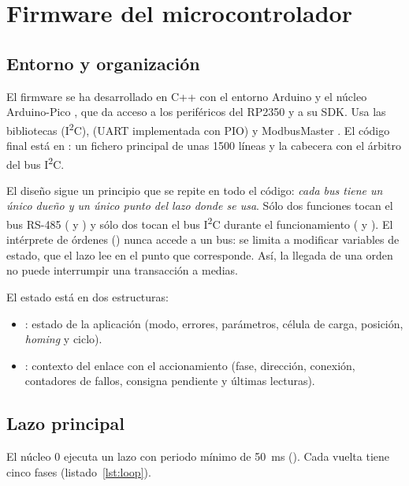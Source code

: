 \chapter{Firmware del microcontrolador}
\label{chap:firmware}

\section{Entorno y organización}

El firmware se ha desarrollado en C++ con el entorno Arduino y el núcleo Arduino-Pico
\cite{arduinopico}, que da acceso a los periféricos del RP2350 y a su SDK. Usa las bibliotecas
 (I\textsuperscript{2}C),  (UART implementada con PIO) y ModbusMaster
\cite{modbusmaster}. El código final está en : un fichero principal
de unas 1500 líneas y la cabecera  con el árbitro del bus I\textsuperscript{2}C.

El diseño sigue un principio que se repite en todo el código: \emph{cada bus tiene un único dueño y
un único punto del lazo donde se usa}. Sólo dos funciones tocan el bus RS-485
( y ) y sólo dos tocan el bus I\textsuperscript{2}C durante
el funcionamiento ( y ). El intérprete de órdenes
() nunca accede a un bus: se limita a modificar variables de estado, que el
lazo lee en el punto que corresponde. Así, la llegada de una orden no puede interrumpir una
transacción a medias.

El estado está en dos estructuras:
\begin{itemize}
  \item {}: estado de la aplicación (modo, errores, parámetros, célula de
        carga, posición, \emph{homing} y ciclo).
  \item {}: contexto del enlace con el accionamiento (fase, dirección, conexión,
        contadores de fallos, consigna pendiente y últimas lecturas).
\end{itemize}

\section{Lazo principal}
\label{sec:fw-lazo}

El núcleo 0 ejecuta un lazo con periodo mínimo de \SI{50}{\milli\second} (). Cada vuelta
tiene cinco fases (listado~\ref{lst:loop}).

